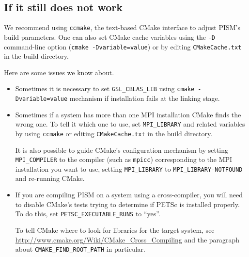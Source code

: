 \documentclass[11pt,final]{amsart}
\begin{document}
\clearpage
\subsection{If it still does not work}
\label{subsec:config}

We recommend using \texttt{ccmake}, the text-based CMake interface to adjust PISM's build parameters. One can also set CMake cache
variables using the \texttt{-D} command-line option (\texttt{cmake -Dvariable=value}) or by editing \texttt{CMakeCache.txt} in the
build directory.

Here are some issues we know about.
\begin{itemize}
\item Sometimes it is necessary to set \texttt{GSL_CBLAS_LIB} using \texttt{cmake -Dvariable=value} mechanism if installation
  fails at the linking stage.
\item Sometimes if a system has more than one MPI installation CMake finds the wrong one. To tell it which one to use, set
  \texttt{MPI_LIBRARY} and related variables by using \texttt{ccmake} or editing \texttt{CMakeCache.txt} in the build directory.

  It is also possible to guide CMake's configuration mechanism by setting \texttt{MPI_COMPILER} to the compiler (such as
  \texttt{mpicc}) corresponding to the MPI installation you want to use, setting \texttt{MPI_LIBRARY} to
  \texttt{MPI_LIBRARY-NOTFOUND} and re-running CMake.
\item If you are compiling PISM on a system using a cross-compiler, you will need to disable CMake's tests trying to determine if
  PETSc is installed properly. To do this, set \texttt{PETSC_EXECUTABLE_RUNS} to ``yes''.

  To tell CMake where to look for libraries for the target system, see \url{http://www.cmake.org/Wiki/CMake_Cross_Compiling} and
  the paragraph about \texttt{CMAKE_FIND_ROOT_PATH} in particular.
\end{itemize}



\clearpage
\end{document}
